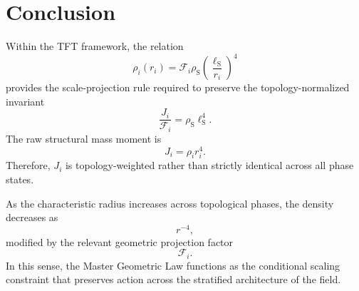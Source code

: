 \section{Conclusion}
Within the TFT framework, the relation
\begin{equation}
    \rho_i(r_i) = \mathcal{F}_i\rho_{\mathrm{S}} \left( \frac{\ell_{\mathrm{S}}}{r_i} \right)^4
\end{equation}
provides the scale-projection rule required to preserve the topology-normalized invariant
\begin{equation}
    \frac{J_i}{\mathcal{F}_i} = \rho_{\mathrm{S}}\ell_{\mathrm{S}}^4.
\end{equation}
The raw structural mass moment is
\begin{equation}
    J_i = \rho_i r_i^4.
\end{equation}
Therefore, $J_i$ is topology-weighted rather than strictly identical across all phase states.

As the characteristic radius increases across topological phases, the density decreases as
\begin{equation}
    r^{-4},
\end{equation}
modified by the relevant geometric projection factor
\begin{equation}
    \mathcal{F}_i.
\end{equation}
In this sense, the Master Geometric Law functions as the conditional scaling constraint that preserves action across the stratified architecture of the field.